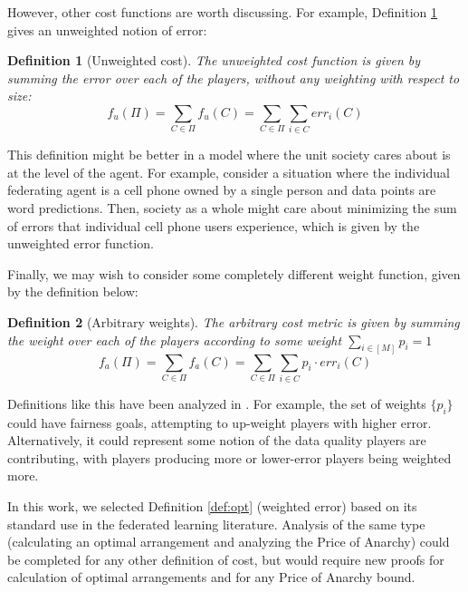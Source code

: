 \documentclass{article}
\newcommand{\cd}[0]{\cdot}
\newtheorem{definition}{Definition}
\newcommand{\nplayer}[0]{\ensuremath{M}}
\newcommand{\col}[0]{\ensuremath{C}}
\newcommand{\partition}[0]{\ensuremath{\Pi}}
\begin{document}
However, other cost functions are worth discussing. For example, Definition \ref{def:unweight} gives an unweighted notion of error: 

\begin{definition}[Unweighted cost]\label{def:unweight}
The unweighted cost function is given by summing the error over each of the players, without any weighting with respect to size: 
$$f_{u}(\Pi) = \sum_{\col \in \partition}f_{u}(\col) = \sum_{\col \in \partition}\sum_{i \in \col} err_{i}(\col)$$
\end{definition}

This definition might be better in a model where the unit society cares about is at the level of the agent. For example, consider a situation where the individual federating agent is a cell phone owned by a single person and data points are word predictions. Then, society as a whole might care about minimizing the sum of errors that individual cell phone users experience, which is given by the unweighted error function. 

Finally, we may wish to consider some completely different weight function, given by the definition below: 

\begin{definition}[Arbitrary weights]\label{def:arbweight}
The arbitrary cost metric is given by summing the weight over each of the players according to some weight $\sum_{i \in [\nplayer]} p_i = 1$ 
$$f_{a}(\Pi) = \sum_{\col \in \partition}f_{a}(\col) = \sum_{\col \in \partition}\sum_{i \in \col} p_i \cd err_{i}(\col)$$
\end{definition}

Definitions like this have been analyzed in \cite{li2019fair, mohri2019agnostic, laguel2021superquantile, chen2021dynamic}. For example, the set of weights $\{p_i\}$ could have fairness goals, attempting to up-weight players with higher error. Alternatively, it could represent some notion of the data quality players are contributing, with players producing more or lower-error players being weighted more. 

In this work, we selected Definition \ref{def:opt} (weighted error) based on its standard use in the federated learning literature. Analysis of the same type (calculating an optimal arrangement and analyzing the Price of Anarchy) could be completed for any other definition of cost, but would require new proofs for calculation of optimal arrangements and for any Price of Anarchy bound.  
\end{document}
